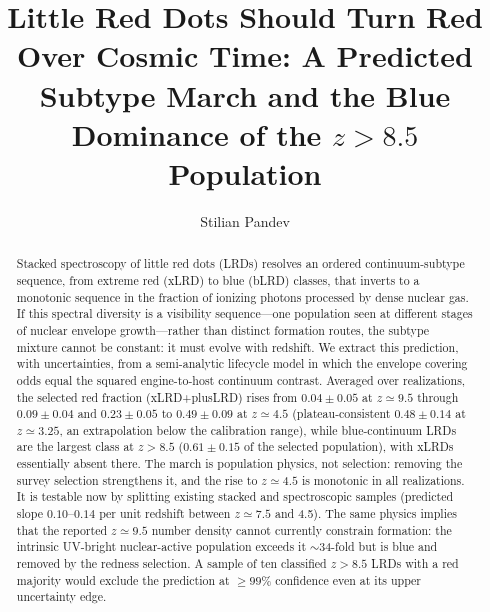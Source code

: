 \documentclass[twocolumn]{aastex631}
\begin{document}
\title{Little Red Dots Should Turn Red Over Cosmic Time: A Predicted
Subtype March and the Blue Dominance of the $z>8.5$ Population}

\author[0009-0005-8153-071X]{Stilian Pandev}


\begin{abstract}
Stacked spectroscopy of little red dots (LRDs) resolves an ordered
continuum-subtype sequence, from extreme red (xLRD) to blue (bLRD)
classes, that inverts to a monotonic sequence in the fraction of ionizing
photons processed by dense nuclear gas. If this spectral diversity is a
visibility sequence---one population seen at different stages of nuclear
envelope growth---rather than distinct formation routes, the subtype
mixture cannot be constant: it must evolve with redshift. We extract this
prediction, with uncertainties, from a semi-analytic lifecycle model in
which the envelope covering odds equal the squared engine-to-host
continuum contrast. Averaged over realizations, the selected red fraction
(xLRD+plusLRD) rises from $0.04\pm0.05$ at $z\simeq9.5$ through
$0.09\pm0.04$ and $0.23\pm0.05$ to $0.49\pm0.09$ at $z\simeq4.5$
(plateau-consistent $0.48\pm0.14$ at $z\simeq3.25$, an extrapolation
below the calibration range), while blue-continuum LRDs are the largest
class at $z>8.5$ ($0.61\pm0.15$ of the selected population), with xLRDs
essentially absent there. The march is population physics, not selection:
removing the survey selection strengthens it, and the rise to
$z\simeq4.5$ is monotonic in all realizations. It is testable now by
splitting existing stacked and spectroscopic samples (predicted slope
$0.10$--$0.14$ per unit redshift between $z\simeq7.5$ and 4.5). The same
physics implies that the reported $z\simeq9.5$ number density cannot
currently constrain formation: the intrinsic UV-bright nuclear-active
population exceeds it $\sim$34-fold but is blue and removed by the
redness selection. A sample of ten classified $z>8.5$ LRDs with a red
majority would exclude the prediction at $\ge99\%$ confidence even at its
upper uncertainty edge.
\end{abstract}

\end{document}
